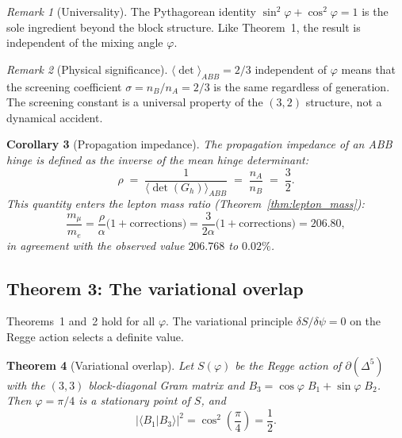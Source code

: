\documentclass[12pt]{article}
\newtheorem{theorem}{Theorem}[section]
\newtheorem{corollary}[theorem]{Corollary}
\theoremstyle{remark}
\newtheorem{remark}[theorem]{Remark}
\theoremstyle{definition}
\begin{document}
\begin{remark}[Universality]
The Pythagorean identity $\sin^2\varphi + \cos^2\varphi = 1$ is the
sole ingredient beyond the block structure.  Like Theorem~1, the
result is independent of the mixing angle $\varphi$.
\end{remark}

\begin{remark}[Physical significance]
$\langle\det\rangle_{ABB} = 2/3$ independent of $\varphi$ means that the screening coefficient $\sigma = n_B/n_A = 2/3$ is the same regardless of generation.  The screening constant is a universal property of the $(3,2)$ structure, not a dynamical accident.
\end{remark}

\begin{corollary}[Propagation impedance]\label{cor:impedance}
The propagation impedance of an ABB hinge is defined as the inverse of
the mean hinge determinant:
\begin{equation}
\rho \;=\; \frac{1}{\langle\det(G_h)\rangle_{ABB}}
\;=\; \frac{n_A}{n_B} \;=\; \frac{3}{2}.
\end{equation}
This quantity enters the lepton mass ratio
(Theorem~\ref{thm:lepton_mass}):
\begin{equation}
\frac{m_\mu}{m_e} = \frac{\rho}{\alpha}
\bigl(1 + \text{corrections}\bigr)
= \frac{3}{2\alpha}
\bigl(1 + \text{corrections}\bigr)
= 206.80,
\end{equation}
in agreement with the observed value $206.768$ to $0.02\%$.
\end{corollary}

\subsection{Theorem 3: The variational overlap}
\label{sec:thm_overlap}

Theorems~1 and~2 hold for all $\varphi$.  The variational principle
$\delta S / \delta\psi = 0$ on the Regge action selects a definite
value.

\begin{theorem}[Variational overlap]\label{thm:overlap}
Let $S(\varphi)$ be the Regge action of $\partial(\Delta^5)$ with the
$(3,3)$ block-diagonal Gram matrix and
$B_3 = \cos\varphi\; B_1 + \sin\varphi\; B_2$.  Then
$\varphi = \pi/4$ is a stationary point of $S$, and
\begin{equation}
\boxed{|\langle B_1 | B_3 \rangle|^2 = \cos^2\!\left(\frac{\pi}{4}\right) = \frac{1}{2}.}
\end{equation}
\end{theorem}
\end{document}
